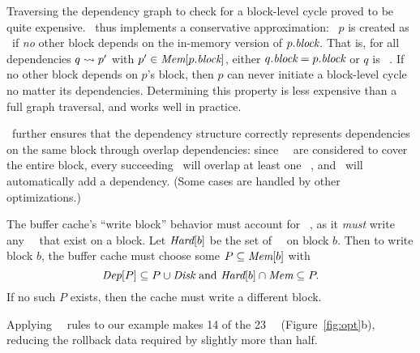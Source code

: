 Traversing the dependency graph to check for a block-level cycle
proved to be quite expensive.
%
\Kudos\ thus implements a conservative approximation: \patch\ $p$ is
created as \nrb\ if \emph{no} other block depends on the in-memory
version of $p.\textit{block}$.
%
That is, for all dependencies $q \leadsto p'$ with $p' \in
\PMem[\PBlock{p}]$, either $q.\textit{block} = p.\textit{block}$ or $q$ is \anoop\
\patch.
%
If no other block depends on $p$'s block, then $p$ can never initiate a
block-level cycle no matter its dependencies.
%
Determining this property is less expensive than a full graph
traversal, and works well in practice.


\Kudos\ further ensures that the dependency structure correctly
represents dependencies on the same block through overlap
dependencies: since \nrb\ \patches\ are considered to cover the entire
block, every succeeding \patch\ will overlap at least one \nrb\ \patch,
and \Kudos\ will automatically add a dependency.
%
(Some cases are handled by other optimizations.)


The buffer cache's ``write block'' behavior must account for \nrb\
\patches, as it \emph{must} write any \nrb\ \patches\ that exist on a
block.
%
Let $\PHard[b]$ be the set of \nrb\ \patches\ on block $b$.
%
Then to write block $b$, the buffer cache must choose some $P \subseteq
\PMem[b]$ with
%
\[ \PDepset{P} \subseteq P \cup \PDisk \text{ and } \PHard[b] \cap \PMem
\subseteq P. \]
%
If no such $P$ exists, then the cache must write a different block.


Applying \nrb\ \patch\ rules to our example makes 14 of the 23 \patches\ \nrb\
(Figure~\ref{fig:opt}b),
%
reducing the rollback data required by slightly more than half.



